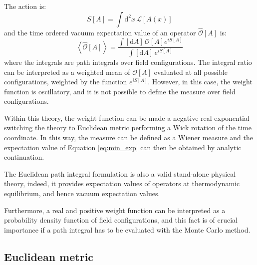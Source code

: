 The action is:
\[ S[A] = \int \mathrm d^2x\, \mathcal L[A(x)]
\]
and the time ordered vacuum expectation value of an operator $\widehat{\mathcal O}[A]$ is:
\begin{equation}\label{eq:min_exp}
    \left< \widehat{\mathcal O}[A] \right> = \frac{\int[\mathrm dA]\, \mathcal O[A] e^{iS[A]}}{\int[\mathrm dA]\,e^{iS[A]}}
\end{equation}
where the integrals are path integrals over field configurations.
The integral ratio can be interpreted as a weighted mean of $\mathcal O[A]$ evaluated at all possible configurations, weighted by the function $e^{iS[A]}$.
However, in this case, the weight function is oscillatory, and it is not possible to define the measure over field configurations.

Within this theory, the weight function can be made a negative real exponential switching the theory to Euclidean metric performing a Wick rotation of the time coordinate.
In this way, the measure can be defined as a Wiener measure and the expectation value of Equation \eqref{eq:min_exp} can then be obtained by analytic continuation.

The Euclidean path integral formulation is also a valid stand-alone physical theory, indeed,
it provides expectation values of operators at thermodynamic equilibrium, and hence vacuum expectation values.

Furthermore, a real and positive weight function can be interpreted as a probability density function of field configurations,
and this fact is of crucial importance if a path integral has to be evaluated with the Monte Carlo method.

\subsection*{Euclidean metric}


